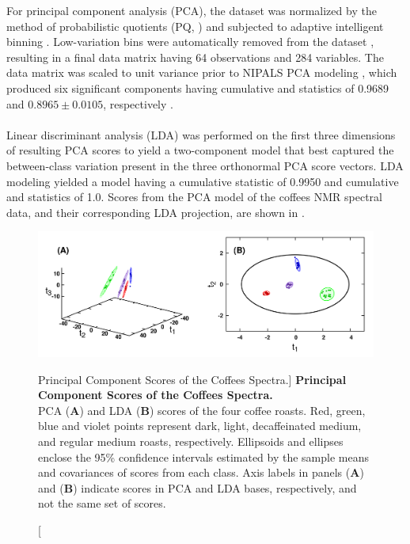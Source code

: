 \begin{doublespace}
For principal component analysis (PCA), the dataset was normalized by the
method of probabilistic quotients (PQ, \cite{dieterle:anchem2006}) and
subjected to adaptive intelligent binning \cite{demeyer:anchem2008}.
Low-variation bins were automatically removed from the dataset
\cite{zhang:opin2008}, resulting in a final data matrix having 64 observations
and 284 variables. The data matrix was scaled to unit variance
\cite{vandenberg:bmcg2006} prior to NIPALS PCA modeling \cite{jolliffe2002},
which produced six significant components having cumulative \rsqx{} and
\qsq{} statistics of 0.9689 and $0.8965 \pm 0.0105$, respectively
\cite{eshghi:cils2014}.
\\\\
Linear discriminant analysis (LDA) was performed on the first three dimensions
of resulting PCA scores to yield a two-component model that best
captured the between-class variation present in the three orthonormal PCA
score vectors. LDA modeling yielded a model having a cumulative \rsqx{}
statistic of 0.9950 and cumulative \rsqy{} and \qsq{} statistics of 1.0.
Scores from the PCA model of the coffees \hnmr{} NMR spectral data, and
their corresponding LDA projection, are shown in .
\end{doublespace}

\begin{figure}[ht!]
\includegraphics[width=6in]{figs/apps/03-pca-lda.png}
\caption
      [Principal Component Scores of the Coffees Spectra.]{
  {\bf Principal Component Scores of the Coffees Spectra.}
  \\
  PCA ({\bf A}) and LDA ({\bf B}) scores of the four coffee roasts. Red,
  green, blue and violet points represent dark, light, decaffeinated medium,
  and regular medium roasts, respectively. Ellipsoids and ellipses enclose
  the 95\% confidence intervals estimated by the sample means and covariances
  of scores from each class. Axis labels in panels ({\bf A}) and ({\bf B})
  indicate scores in PCA and LDA bases, respectively, and not the same set
  of scores.
}
\label{figure.4.3}
\end{figure}

